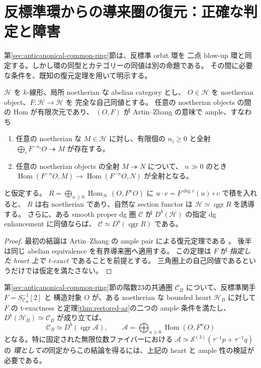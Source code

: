 \section{反標準環からの導来圏の復元：正確な判定と障害}
\label{sec:restored-anticanonical}
第\ref{sec:anticanonical-common-ring}節は、反標準 orbit 環を
二点 blow-up 環と同定する。しかし環の同型とカテゴリーの同値は別の命題である。
その間に必要な条件を、既知の復元定理を用いて明示する。

\begin{theorem}\label{thm:restored-az}
$\mathcal H$ を $k$-線形、局所 noetherian な abelian category とし、
$O\in\mathcal H$ を noetherian object、$F:\mathcal H\to\mathcal H$ を
完全な自己同値とする。
任意の noetherian objects の間の Hom が有限次元であり、
$(O,F)$ が Artin--Zhang の意味で ample、すなわち
\begin{enumerate}
\item 任意の noetherian な $M\in\mathcal H$ に対し、有限個の $n_i\ge0$ と全射
$\bigoplus_iF^{-n_i}O\twoheadrightarrow M$ が存在する。
\item 任意の noetherian objects の全射 $M\twoheadrightarrow N$ について、
$n\gg0$ のとき
$\operatorname{Hom}(F^{-n}O,M)\to\operatorname{Hom}(F^{-n}O,N)$ が全射となる。
\end{enumerate}
と仮定する。
$R=\bigoplus_{n\ge0}\operatorname{Hom}_{\mathcal H}(O,F^nO)$ に
$u\cdot v=F^{\deg v}(u)\circ v$ で積を入れると、
$R$ は右 noetherian であり、自然な section functor は
$\mathcal H\simeq\operatorname{qgr}R$ を誘導する。
さらに、ある smooth proper dg 圏 $\mathcal C$ が
$D^b(\mathcal H)$ の指定 dg enhancement に同値ならば、
$\mathcal C\simeq D^b(\operatorname{qgr}R)$ である。
\end{theorem}
\begin{proof}
最初の結論は Artin--Zhang の ample pair による復元定理である
\cite{KeelerNCRings,ArtinZhang1994}。
後半は同じ abelian equivalence を有界導来圏へ適用する。
この定理は $F$ が \emph{指定した heart 上で t-exact} であることを前提とする。
三角圏上の自己同値であるというだけでは仮定を満たさない。
\end{proof}

\begin{corollary}[本研究に必要な検証項目]\label{cor:restored-az-criteria}
第\ref{sec:anticanonical-common-ring}節の階数23の共通圏 $\mathcal C_B$
について、反標準関手 $F=S_{\mathcal C_B}^{-1}[2]$ と
構造対象 $O$ が、ある noetherian な bounded heart $\mathcal H_B$ に対して
$F$ の t-exactness と定理\ref{thm:restored-az}の二つの ample 条件を満たし、
$D^b(\mathcal H_B)\simeq\mathcal C_B$ が成り立てば、
\[
\mathcal C_B\simeq D^b(\operatorname{qgr}\mathscr A),
\qquad
\mathscr A=\bigoplus_{n\ge0}\operatorname{Hom}(O,F^nO)
\]
となる。特に固定された無限位数ファイバーにおける
$\mathscr A\simeq\mathcal S^{(3)}(\tau^{-1}p+\tau^{-1}q)$ の
\emph{環としての}同定からこの結論を得るには、上記の heart と ample 性の検証が必要である。
\end{corollary}

